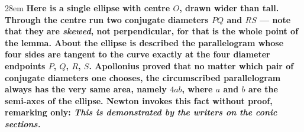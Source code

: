 \documentclass[border=4pt]{standalone}
\begin{document}
\begin{varwidth}{28em}
\large\bfseries
Here is a single ellipse with centre $O$, drawn wider than tall. Through the centre run two conjugate diameters $PQ$ and $RS$ --- note that they are \emph{skewed}, not perpendicular, for that is the whole point of the lemma. About the ellipse is described the parallelogram whose four sides are tangent to the curve exactly at the four diameter endpoints $P$, $Q$, $R$, $S$. Apollonius proved that no matter which pair of conjugate diameters one chooses, the circumscribed parallelogram always has the very same area, namely $4ab$, where $a$ and $b$ are the semi-axes of the ellipse. Newton invokes this fact without proof, remarking only: \textit{This is demonstrated by the writers on the conic sections.}
\end{varwidth}
\end{document}
